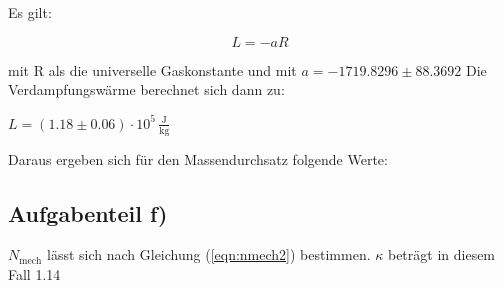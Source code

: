         Es gilt:

        \begin{equation}
        L=-aR
        \label{eqn:verdampfungswaerme}
        \end{equation}

        mit R als die universelle Gaskonstante und mit $a=-1719.8296 \pm 88.3692$
        Die Verdampfungswärme berechnet sich dann zu:

        $L=(1{.}18 \pm 0{.}06) \cdot 10^{5}\,\mathrm{\frac{J}{kg}}$

        Daraus ergeben sich für den Massendurchsatz folgende Werte:
        
        

        \newpage
        \subsection{Aufgabenteil f)}

        $N_\text{mech}$ lässt sich nach Gleichung (\ref{eqn:nmech2}) bestimmen.
        $\kappa$ beträgt in diesem Fall 1.14

        

        